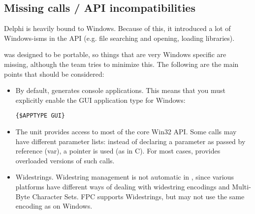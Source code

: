 \subsection{Missing calls / API incompatibilities}
Delphi is heavily bound to Windows. Because of this, it introduced a lot of 
Windows-isms in the API (e.g. file searching and opening, loading libraries).

\fpc was designed to be portable, so things that are very Windows 
specific are missing, although the \fpc team tries to minimize this.
The following are the main points that should be considered:

\begin{itemize}
\item By default, \fpc generates console applications. This means that
you must explicitly enable the GUI application type for Windows:
\begin{verbatim}
{$APPTYPE GUI}
\end{verbatim}
\item The  unit provides access to most of the core 
Win32 API. Some calls may have different parameter lists: instead 
of declaring a parameter as passed by reference (var), a pointer 
is used (as in C). For most cases, \fpc provides overloaded versions 
of such calls.
\item Widestrings. Widestring management is not automatic in \fpc, 
since various platforms have different ways of dealing with widestring 
encodings and Multi-Byte Character Sets. 
FPC supports Widestrings, but may not use the same encoding as on Windows.


\end{itemize}
